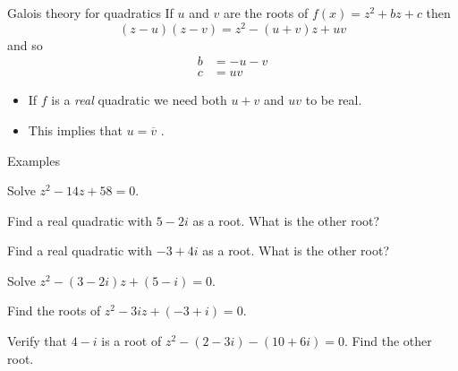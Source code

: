 \documentclass{beamer}
\begin{document}
\begin{frame}{Galois theory for quadratics}
If $u$ and $v$ are the roots of $f(x) = z^2 + bz+c$ then
\begin{equation*}
(z-u)(z-v) = z^2 - (u+v)z + uv
\end{equation*}
and so
\begin{align*}
b & = -u-v\\
c & = uv
\end{align*}
\begin{itemize}
	\item If $f$ is a \emph{real} quadratic we need both $u+v$ and $uv$ to be real.
	\item This implies that $u = \overline{v}$ .
\end{itemize}
\end{frame}

\begin{frame}{Examples}
\begin{example}
Solve $z^2-14z+58 = 0$.
\end{example}
\begin{example}
Find a real quadratic with $5-2i$ as a root. What is the other root?
\end{example}
\begin{example}
Find a real quadratic with $-3+4i$ as a root. What is the other root?
\end{example}
\end{frame}

\begin{frame}
\begin{example}
Solve $z^2-(3-2i)z + (5-i) = 0$.
\end{example}
\begin{example}
Find the roots of $z^2-3iz+(-3+i) = 0$.
\end{example}
\begin{example}
Verify that $4-i$ is a root of $z^2 - (2-3i)-(10+6i) = 0$. Find the other root.
\end{example}
\end{frame}
\end{document}
